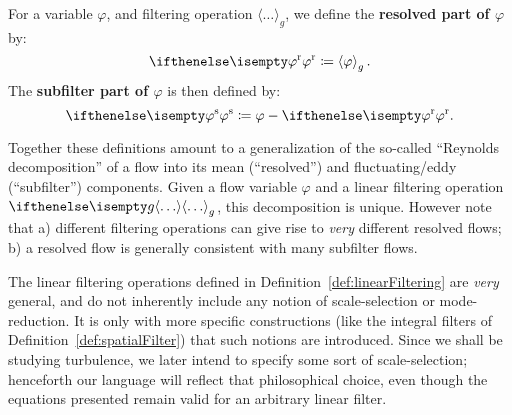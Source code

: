 \begin{definition}\label{def:resolvedVariables}
    For a variable $\varphi$, and filtering operation $\langle\dots\rangle_g$, we define the \textbf{resolved part of $\varphi$} by:
    \begin{equation}
        \resolved{\varphi}
        \coloneqq
        \left\langle
            \varphi
        \right\rangle_g.
        \label{eq:resolvedVarDefinition}
    \end{equation}
    The \textbf{subfilter part of $\varphi$} is then defined by:
    \begin{equation}
        \subfilter{\varphi}
        \coloneqq
        \varphi - \resolved{\varphi}.
        \label{eq:subfilterVarDefinition}
    \end{equation}
    
    Together these definitions amount to a generalization of the so-called ``Reynolds decomposition'' of a flow into its mean (``resolved'') and fluctuating/eddy (``subfilter'') components.
    Given a flow variable $\varphi$ and a linear filtering operation $\filter[g]{\dots}$, this decomposition is unique.
    However note that a) different filtering operations can give rise to \textit{very} different resolved flows; b) a resolved flow is generally consistent with many subfilter flows.
\end{definition}

The linear filtering operations defined in Definition~\ref{def:linearFiltering} are \textit{very} general, and do not inherently include any notion of scale-selection or mode-reduction.
It is only with more specific constructions (like the integral filters of Definition~\ref{def:spatialFilter}) that such notions are introduced.
Since we shall be studying turbulence, we later intend to specify some sort of scale-selection; henceforth our language will reflect that philosophical choice, even though the equations presented remain valid for an arbitrary linear filter.

